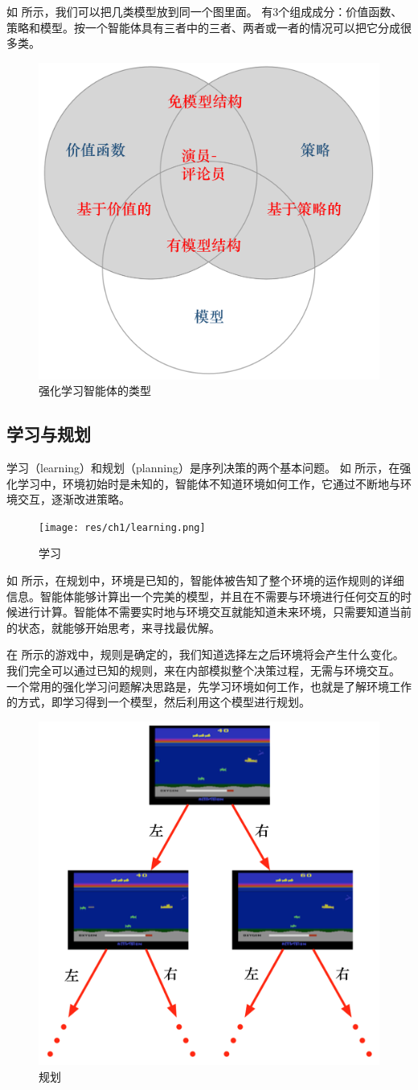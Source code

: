 如 所示，我们可以把几类模型放到同一个图里面。 有3个组成成分：价值函数、策略和模型。按一个智能体具有三者中的三者、两者或一者的情况可以把它分成很多类。

\begin{figure}[htb]
    \centering
    \includegraphics[width=0.3\linewidth]{res/ch1/1.36}
    \caption{强化学习智能体的类型}
    \label{fig:fig1.36}
\end{figure}

\subsection{学习与规划} 

学习（learning）和规划（planning）是序列决策的两个基本问题。
如 所示，在强化学习中，环境初始时是未知的，智能体不知道环境如何工作，它通过不断地与环境交互，逐渐改进策略。

\begin{figure}[htb]
    \centering
    \texttt{[image: res/ch1/learning.png]}
    \caption{学习}
    \label{fig:learning}
\end{figure}

如 所示，在规划中，环境是已知的，智能体被告知了整个环境的运作规则的详细信息。智能体能够计算出一个完美的模型，并且在不需要与环境进行任何交互的时候进行计算。智能体不需要实时地与环境交互就能知道未来环境，只需要知道当前的状态，就能够开始思考，来寻找最优解。

在 所示的游戏中，规则是确定的，我们知道选择左之后环境将会产生什么变化。我们完全可以通过已知的规则，来在内部模拟整个决策过程，无需与环境交互。
一个常用的强化学习问题解决思路是，先学习环境如何工作，也就是了解环境工作的方式，即学习得到一个模型，然后利用这个模型进行规划。

\begin{figure}[htb]
    \centering
    \includegraphics[width=0.4\linewidth]{res/ch1/planning.png}
    \caption{规划}
    \label{fig:planning}
\end{figure}

